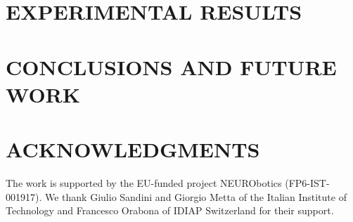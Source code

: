 \documentclass{article}
\begin{document}
\section{EXPERIMENTAL RESULTS}
\label{sec:res}


\section{CONCLUSIONS AND FUTURE WORK}
\label{sec:concl}


\section*{ACKNOWLEDGMENTS}

The work is supported by the EU-funded project NEURObotics
(FP6-IST-001917). We thank Giulio Sandini and Giorgio Metta of the
Italian Institute of Technology and Francesco Orabona of IDIAP
Switzerland for their support.


{\small


}
\end{document}
